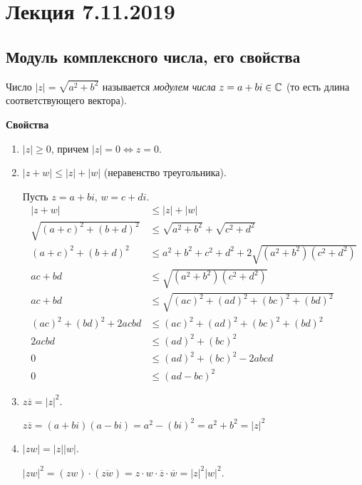 \section{Лекция 7.11.2019}

\subsection{Модуль комплексного числа, его свойства}

\begin{definition}
    Число $|z| = \sqrt{a^2 + b^2}$ называется \textit{модулем числа} $z = a + bi \in \mathbb{C}$ (то есть длина соответствующего вектора).
\end{definition}

\textbf{Свойства}
\begin{enumerate}
\item $|z| \geq 0$, причем $|z| = 0 \iff z = 0$.
\item $|z + w| \leq |z| + |w|$ (неравенство треугольника).

    Пусть $z = a + bi$, $w = c + di$.
    \begin{align*}
        |z + w| &\leq |z| + |w| \\
        \sqrt{(a + c)^2 + (b + d)^2} &\leq \sqrt{a^2 + b^2} + \sqrt{c^2 + d^2} \\
        (a + c)^2 + (b + d)^2 &\leq a^2 + b^2 + c^2 + d^2 + 2\sqrt{(a^2 + b^2)(c^2 + d^2)} \\
        ac + bd &\leq\sqrt{(a^2 + b^2)(c^2 + d^2)} \\
        ac + bd &\leq\sqrt{(ac)^2 + (ad)^2 + (bc)^2 + (bd)^2} \\
        (ac)^2 + (bd)^2 + 2acbd &\leq (ac)^2 + (ad)^2 + (bc)^2 + (bd)^2 \\
        2acbd &\leq (ad)^2 + (bc)^2 \\
        0 &\leq (ad)^2 + (bc)^2 - 2abcd \\
        0 &\leq (ad - bc)^2
    \end{align*}
\item $z \overline{z} = |z|^2$.

    $z \overline{z} = (a + bi)(a - bi) = a^2 - (bi)^2 = a^2 + b^2 = |z|^2$
\item $|zw| = |z||w|$.

    $|zw|^2 = (zw) \cdot (\overline{zw}) = z \cdot w \cdot \overline{z} \cdot \overline{w} = |z|^2 |w|^2$.
\end{enumerate}

\begin{comment}
    Из 3) следует, что для $\forall z \neq 0$, $z^{-1} = \frac{\overline{z}}{|z|^2}$, то есть $(a + bi)^{-1} = \frac{a-bi}{a^2 + b^2}$
\end{comment}


